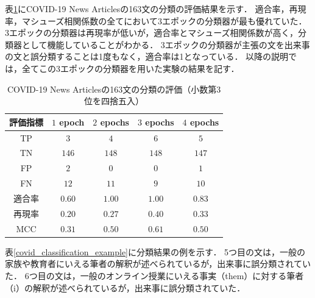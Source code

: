 \documentclass[12pt,a4j,dvipdfmx]{jreport}
\begin{document}
\newpage

表\ref{covid_classification_evaluation}にCOVID-19 News Articlesの163文の分類の評価結果を示す．
適合率，再現率，マシューズ相関係数の全てにおいて3エポックの分類器が最も優れていた．
3エポックの分類器は再現率が低いが，適合率とマシューズ相関係数が高く，分類器として機能していることがわかる．
3エポックの分類器が主張の文を出来事の文と誤分類することは1度もなく，適合率は1となっている．
以降の説明では，全てこの3エポックの分類器を用いた実験の結果を記す．

\begin{table}[H]
  \caption{
    COVID-19 News Articlesの163文の分類の評価（小数第3位を四捨五入）
  }
  \centering
  \vspace{4mm}
    \begin{tabular}{ccccc}
    \hline
    評価指標 & $1$ epoch & $2$ epochs & $3$ epochs & $4$ epochs
    \\
    \hline
    TP & $3$ & $4$ & $6$ & $5$
    \\
    TN & $146$ & $148$ & $148$ & $147$
    \\
    FP & $2$ & $0$ & $0$ & $1$
    \\
    FN & $12$ & $11$ & $9$ & $10$
    \\
    適合率 & $0.60$ & $\mathbf{1.00}$ & $\mathbf{1.00}$ & $0.83$
    \\
    再現率 & $0.20$ & $0.27$ & $\mathbf{0.40}$ & $0.33$
    \\
    MCC & $0.31$ & $0.50$ & $\mathbf{0.61}$ & $0.50$
    \\
    \hline
    \end{tabular}
  \label{covid_classification_evaluation}
\end{table}

\newpage

表\ref{covid_classification_example}に分類結果の例を示す．
5つ目の文は，一般の家族や教育者にいえる筆者の解釈が述べられているが，出来事に誤分類されていた．
6つ目の文は，一般のオンライン授業にいえる事実（them）に対する筆者（i）の解釈が述べられているが，出来事に誤分類されていた．
\end{document}
